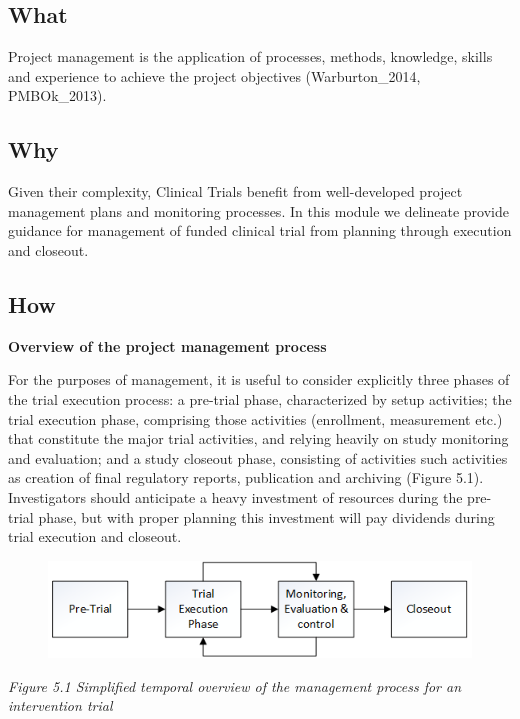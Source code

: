 \documentclass[]{book}
\theoremstyle{definition}
\theoremstyle{definition}
\theoremstyle{definition}
\theoremstyle{remark}
\begin{document}
\subsection{What}\label{what-17}

Project management is the application of processes, methods, knowledge,
skills and experience to achieve the project objectives
(Warburton\_2014, PMBOk\_2013).

\subsection{Why}\label{why-17}

Given their complexity, Clinical Trials benefit from well-developed
project management plans and monitoring processes. In this module we
delineate provide guidance for management of funded clinical trial from
planning through execution and closeout.

\subsection{How}\label{how-17}

\textbf{Overview of the project management process}

For the purposes of management, it is useful to consider explicitly
three phases of the trial execution process: a pre-trial phase,
characterized by setup activities; the trial execution phase, comprising
those activities (enrollment, measurement etc.) that constitute the
major trial activities, and relying heavily on study monitoring and
evaluation; and a study closeout phase, consisting of activities such
activities as creation of final regulatory reports, publication and
archiving (Figure 5.1). Investigators should anticipate a heavy
investment of resources during the pre-trial phase, but with proper
planning this investment will pay dividends during trial execution and
closeout.

\begin{figure}
\centering
\includegraphics{images/book/pm1.png}
\caption{}
\end{figure}

\emph{Figure 5.1 Simplified temporal overview of the management process
for an intervention trial}
\end{document}

